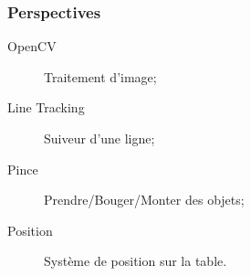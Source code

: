 \begin{frame}
\frametitle{Perspectives}
\begin{description}
\item[OpenCV] Traitement d'image;
\item[Line Tracking] Suiveur d'une ligne;
\item[Pince] Prendre/Bouger/Monter des objets;
\item[Position] Système de position sur la table.
\end{description}
\end{frame}
